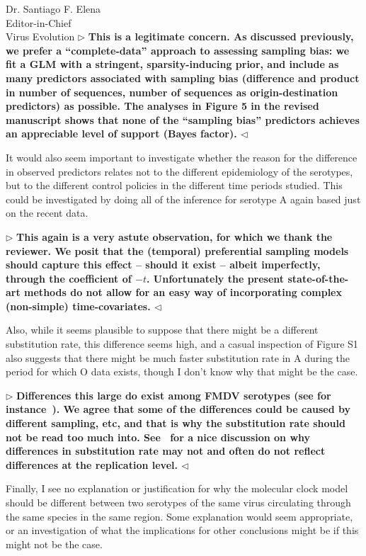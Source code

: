 \documentclass[ucla,biomath,12pt,noaddrfooter,datefrom]{UC_letter}
\newenvironment{reply}{$\triangleright$\bf}{$\triangleleft$}
\begin{document}
\begin{letter}{
Dr. Santiago F. Elena \\
Editor-in-Chief \\
Virus Evolution
}
\begin{reply}
This is a legitimate concern. 
As discussed previously, we prefer a ``complete-data'' approach to assessing sampling bias: we fit a GLM with a stringent, sparsity-inducing prior, and include as many predictors associated with sampling bias (difference and product in number of sequences, number of sequences as origin-destination predictors) as possible.
The analyses in Figure 5 in the revised manuscript shows that none of the ``sampling bias'' predictors achieves an appreciable level of support (Bayes factor).
\end{reply}

It would also seem important to investigate whether the reason for the difference in observed predictors relates not to the different epidemiology of the serotypes, but to the different control policies in the different time periods studied. 
This could be investigated by doing all of the inference for serotype A again based just on the recent data.

\begin{reply}
This again is a very astute observation, for which we thank the reviewer.
We posit that the (temporal) preferential sampling models should capture this effect -- should it exist -- albeit imperfectly, through the coefficient of $-t$.
Unfortunately the present state-of-the-art methods do not allow for an easy way of incorporating complex (non-simple) time-covariates.
\end{reply}

Also, while it seems plausible to suppose that there might be a different substitution rate, this difference seems high, and a casual inspection of Figure S1 also suggests that there might be much faster substitution rate in A during the period for which O data exists, though I don't know why that might be the case.

\begin{reply}
Differences this large do exist among FMDV serotypes (see for instance~\cite{Tully2008}).
We agree that some of the differences could be caused by different sampling, etc, and that is why the substitution rate should not be read too much into.
See~\cite{Holmes2016} for a nice discussion on why differences in substitution rate may not and often do not reflect differences at the replication level.
\end{reply}

Finally, I see no explanation or justification for why the molecular clock model should be different between two serotypes of the same virus circulating through the same species in the same region. 
Some explanation would seem appropriate, or an investigation of what the implications for other conclusions might be if this might not be the case.


\end{letter}
\end{document}
